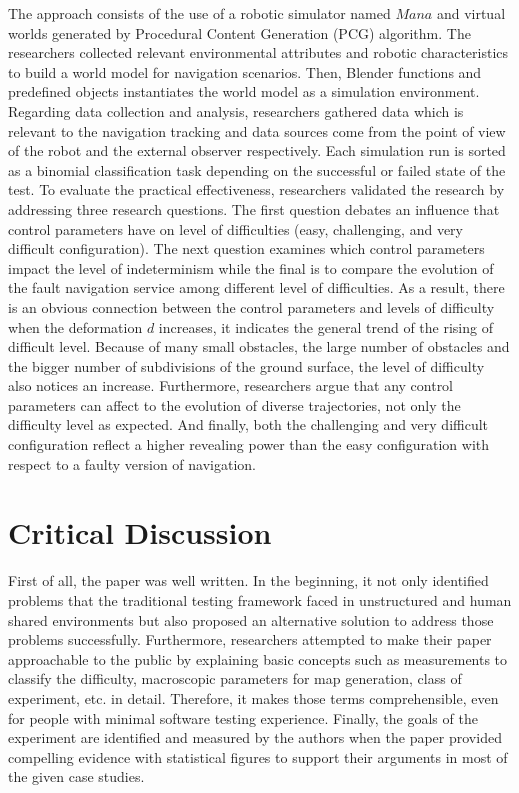 \documentclass[10pt,a4paper]{report}
\begin{document}
The approach consists of the use of a robotic simulator named $Mana$ and virtual worlds generated by Procedural Content Generation (PCG) algorithm. 
%
The researchers collected relevant environmental attributes and robotic characteristics to build a world model for navigation scenarios.
%
Then, Blender functions and predefined objects instantiates the world model as a simulation environment.
%
Regarding data collection and analysis, researchers gathered data which is relevant to the navigation tracking and data sources come from the point of view of the robot and the external observer respectively.
%
Each simulation run is sorted as a binomial classification task depending on the successful or failed state of the test.
%
To evaluate the practical effectiveness, researchers validated the research by addressing three research questions.
%
The first question debates an influence that control parameters have on level of difficulties (easy, challenging, and very difficult configuration).
%
The next question examines which control parameters impact the level of indeterminism while the final is to compare the evolution of the fault navigation service among different level of difficulties.
%
As a result, there is an obvious connection between the control parameters and levels of difficulty when the deformation $d$ increases, it indicates the general trend of the rising of difficult level.
%
Because of many small obstacles, the large number of obstacles and the bigger number of subdivisions of the ground surface, the level of difficulty also notices an increase.
%
Furthermore, researchers argue that any control parameters can affect to the evolution of diverse trajectories, not only the difficulty level as expected.
%
And finally, both the challenging and very difficult configuration reflect a higher revealing power than the easy configuration with respect to a faulty version of navigation.



\section{Critical Discussion}
First of all, the paper was well written. In the beginning, it not only identified problems that the traditional testing framework faced in unstructured and human shared environments but also proposed an alternative solution to address those problems successfully.
%
Furthermore, researchers attempted to make their paper approachable to the public by explaining basic concepts such as measurements to classify the difficulty, macroscopic parameters for map generation, class of experiment, etc. in detail. Therefore, it makes those terms comprehensible, even for people with minimal software testing experience.  
%
Finally, the goals of the experiment are identified and measured by the authors when the paper provided compelling evidence with statistical figures to support their arguments in most of the given case studies.
%
\end{document}
